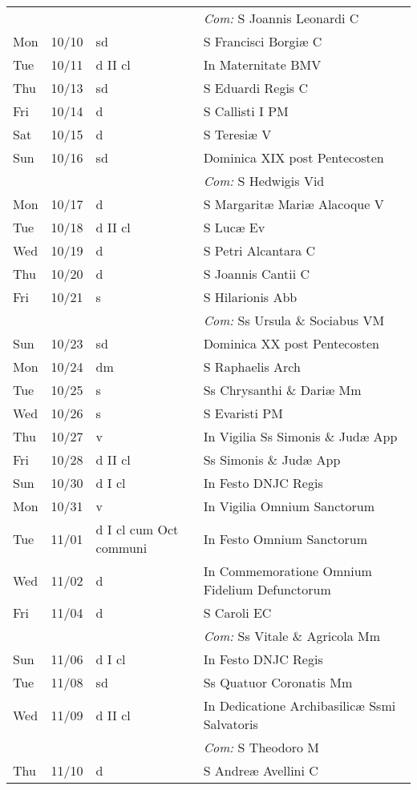 \documentclass[10pt]{article}
\begin{document}
\begin{longtable}{ l l l l }
 & & & \textit{Com:} S Joannis Leonardi C\\
Mon & 10/10 & sd & S Francisci Borgiæ C\\
Tue & 10/11 & d II cl & In Maternitate BMV\\
Thu & 10/13 & sd & S Eduardi Regis C\\
Fri & 10/14 & d & S Callisti I PM\\
Sat & 10/15 & d & S Teresiæ V\\
Sun & 10/16 & sd & Dominica XIX post Pentecosten\\
 & & & \textit{Com:} S Hedwigis Vid\\
Mon & 10/17 & d & S Margaritæ Mariæ Alacoque V\\
Tue & 10/18 & d II cl & S Lucæ Ev\\
Wed & 10/19 & d & S Petri Alcantara C\\
Thu & 10/20 & d & S Joannis Cantii C\\
Fri & 10/21 & s & S Hilarionis Abb\\
 & & & \textit{Com:} Ss Ursula \& Sociabus VM\\
Sun & 10/23 & sd & Dominica XX post Pentecosten\\
Mon & 10/24 & dm & S Raphaelis Arch\\
Tue & 10/25 & s & Ss Chrysanthi \& Dariæ Mm\\
Wed & 10/26 & s & S Evaristi PM\\
Thu & 10/27 & v & In Vigilia Ss Simonis \& Judæ App\\
Fri & 10/28 & d II cl & Ss Simonis \& Judæ App\\
Sun & 10/30 & d I cl & In Festo DNJC Regis\\
Mon & 10/31 & v & In Vigilia Omnium Sanctorum\\
Tue & 11/01 & d I cl cum Oct communi & In Festo Omnium Sanctorum\\
Wed & 11/02 & d & In Commemoratione Omnium Fidelium Defunctorum\\
Fri & 11/04 & d & S Caroli EC\\
 & & & \textit{Com:} Ss Vitale \& Agricola Mm\\
Sun & 11/06 & d I cl & In Festo DNJC Regis\\
Tue & 11/08 & sd & Ss Quatuor Coronatis Mm\\
Wed & 11/09 & d II cl & In Dedicatione Archibasilicæ Ssmi Salvatoris\\
 & & & \textit{Com:} S Theodoro M\\
Thu & 11/10 & d & S Andreæ Avellini C\\

\end{longtable}
\end{document}
